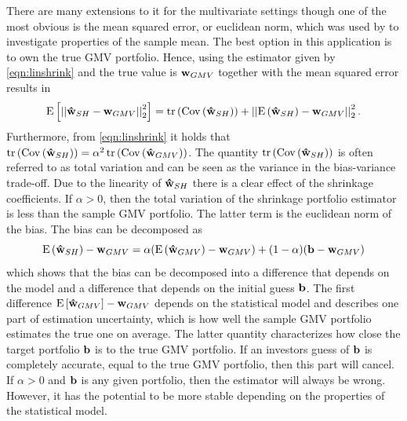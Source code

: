 \documentclass[12pt, twoside]{book}\usepackage{knitr}
\begin{document}
There are many extensions to it for the multivariate settings though one of the most obvious is the mean squared error, or euclidean norm, which was used by 
\citet{stein1956} to investigate properties of the sample mean.
The best option in this application is to own the true GMV portfolio.
Hence, using the estimator given by \eqref{eqn:linshrink} and the true value is $\mathbf{w}_{GMV}$ together with the mean squared error results in
\begin{align*}
  \operatorname{E}\left[\left|\left|\mathbf{\hat{w}}_{SH} - \mathbf{w}_{GMV}\right|\right|^2_2\right] 
  & = \operatorname{tr}\left(\operatorname{Cov}\left(\mathbf{\hat{w}}_{SH}\right)\right) + \left|\left|\operatorname{E}\left(\mathbf{\hat{w}}_{SH}\right) - \mathbf{w}_{GMV}\right|\right|^2_2. \\ 
\end{align*}
Furthermore, from \eqref{eqn:linshrink} it holds that $\operatorname{tr}\left(\operatorname{Cov}\left(\mathbf{\hat{w}}_{SH}\right)\right) = \alpha^2 \operatorname{tr}\left(\operatorname{Cov}\left(\mathbf{\hat{w}}_{GMV}\right)\right)$.
The quantity $\operatorname{tr}\left(\operatorname{Cov}\left(\mathbf{\hat{w}}_{SH}\right)\right)$ is often referred to as total variation and can be seen as the variance in the bias-variance trade-off. 
Due to the linearity of $\mathbf{\hat{w}}_{SH}$ there is a clear effect of the shrinkage coefficients.
If $\alpha>0$, then the total variation of the shrinkage portfolio estimator is less than the sample GMV portfolio.
The latter term is the euclidean norm of the bias.
The bias can be decomposed as
$$
\operatorname{E}\left(\mathbf{\hat{w}}_{SH}\right) - \mathbf{w}_{GMV} = \alpha (\operatorname{E}\left(\mathbf{\hat{w}}_{GMV}\right) - \mathbf{w}_{GMV}) + (1-\alpha) (\mathbf{b} - \mathbf{w}_{GMV})
$$
which shows that the bias can be decomposed into a difference that depends on the model and a difference that depends on the initial guess $\mathbf{b}$.
The first difference $\operatorname{E}\left[\mathbf{\hat{w}}_{GMV}\right] - \mathbf{w}_{GMV}$ depends on the statistical model and describes one part of estimation uncertainty, which is how well the sample GMV portfolio estimates the true one on average.
The latter quantity characterizes how close the target portfolio $\mathbf{b}$ is to the true GMV portfolio. 
If an investors guess of $\mathbf{b}$ is completely accurate, equal to the true GMV portfolio, then this part will cancel.
If $\alpha>0$ and $\mathbf{b}$ is any given portfolio, then the estimator will always be wrong. 
However, it has the potential to be more stable depending on the properties of the statistical model.
\end{document}
